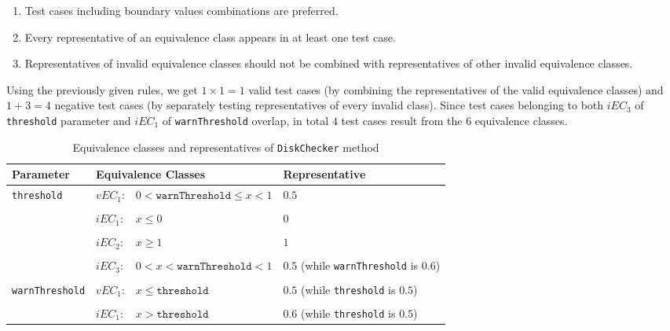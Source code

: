 \documentclass[conference]{IEEEtran}
\begin{document}
\begin{enumerate}
\item Test cases including boundary values combinations are preferred.
\item Every representative of an equivalence class appears in at least one test case.
\item Representatives of invalid equivalence classes should not be combined with representatives of other invalid equivalence classes.
\end{enumerate}

Using the previously given rules, we get $1 \times 1 = 1$ valid test cases (by combining the representatives of the valid equivalence classes) and $1 + 3 = 4$ negative test cases
(by separately testing representatives of every invalid class). Since test cases belonging to both $iEC_3$ of  \texttt{threshold} parameter and $iEC_1$ of \texttt{warnThreshold} overlap, in total $4$ test cases result from the $6$ equivalence classes.

\begin{table*}
  \caption{Equivalence classes and representatives of \texttt{DiskChecker} method}
  \label{tab:DiskCheckerEqClass}
  \centering
  \begin{tabular}{llp{6.5cm}p{8cm}}
    \toprule
    \textbf{Parameter} & \multicolumn{2}{|l|}{\textbf{Equivalence Classes}} & \textbf{Representative} \\
    \midrule
    
	\multirow{3}{*}{\texttt{threshold}} & $vEC_1$: & $0 < \texttt{warnThreshold} \leq x < 1$  & $0.5$ \\    
    
    \\[-1em] 
    & $iEC_1$: & $x \leq 0$ & $0$ \\ 
    
    \\[-1em]
    & $iEC_2$: & $x \geq 1$ & $1$ \\
    
    \\[-1em]
    & $iEC_3$: & $0 < x < \texttt{warnThreshold} < 1$ & $0.5$ (while \texttt{warnThreshold} is $0.6$) \\
    
    \\[-1em] \hline 
	   
    \multirow{3}{*}{\texttt{warnThreshold}} & $vEC_1$: & $x \leq \texttt{threshold}$  & $0.5$ (while \texttt{threshold} is $0.5$) \\    
    
    \\[-1em] 
    & $iEC_1$: & $x > \texttt{threshold}$ & $0.6$ (while \texttt{threshold} is $0.5$) \\  
    
    \bottomrule
  \end{tabular}
\end{table*}
\end{document}
